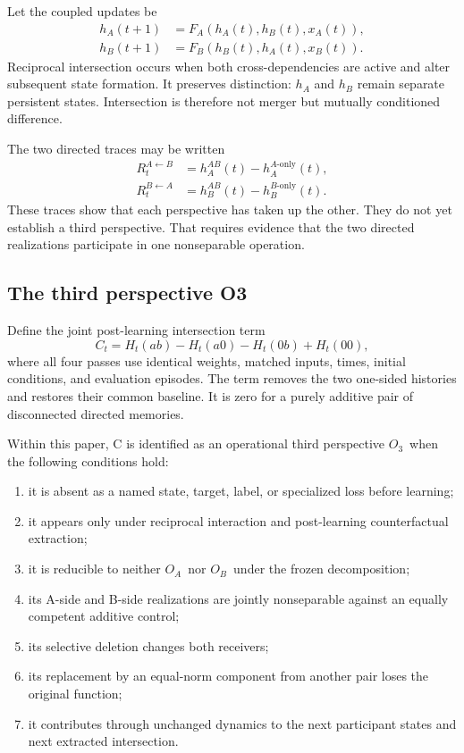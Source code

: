 \documentclass[11pt,a4paper]{article}
\newcommand{\OA}{\ensuremath{O_{A}}}
\newcommand{\OB}{\ensuremath{O_{B}}}
\newcommand{\Othree}{\ensuremath{O_{3}}}
\begin{document}
Let the coupled updates be
\begin{align}
 h_A(t+1)&=F_A(h_A(t),h_B(t),x_A(t)),\\
 h_B(t+1)&=F_B(h_B(t),h_A(t),x_B(t)).
 \label{eq:coupled}
\end{align}
Reciprocal intersection occurs when both cross-dependencies are active and alter subsequent state formation. It preserves distinction: $h_A$ and $h_B$ remain separate persistent states. Intersection is therefore not merger but mutually conditioned difference.

The two directed traces may be written
\begin{align}
 R_t^{A\leftarrow B}&=h_A^{AB}(t)-h_A^{A\text{-only}}(t),\\
 R_t^{B\leftarrow A}&=h_B^{AB}(t)-h_B^{B\text{-only}}(t).
 \label{eq:directed}
\end{align}
These traces show that each perspective has taken up the other. They do not yet establish a third perspective. That requires evidence that the two directed realizations participate in one nonseparable operation.

\subsection{The third perspective O3}

Define the joint post-learning intersection term
\begin{equation}
 C_t=H_t(ab)-H_t(a0)-H_t(0b)+H_t(00),
 \label{eq:joint}
\end{equation}
where all four passes use identical weights, matched inputs, times, initial conditions, and evaluation episodes. The term removes the two one-sided histories and restores their common baseline. It is zero for a purely additive pair of disconnected directed memories.

Within this paper, C is identified as an operational third perspective \Othree\ when the following conditions hold:
\begin{enumerate}
  \item it is absent as a named state, target, label, or specialized loss before learning;
  \item it appears only under reciprocal interaction and post-learning counterfactual extraction;
  \item it is reducible to neither \OA\ nor \OB\ under the frozen decomposition;
  \item its A-side and B-side realizations are jointly nonseparable against an equally competent additive control;
  \item its selective deletion changes both receivers;
  \item its replacement by an equal-norm component from another pair loses the original function;
  \item it contributes through unchanged dynamics to the next participant states and next extracted intersection.
\end{enumerate}
\end{document}
